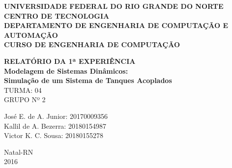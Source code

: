 \documentclass[a4paper,12pt]{article}
\begin{document}
\onehalfspacing

\thispagestyle{empty}

\setcounter{page}{1}


\begin{figure}[!ht]

\centering

\hspace{11.09cm}

\label{Logos}

\end{figure}


\vspace{-1cm}

\begin{center}
{\bf{\normalsize UNIVERSIDADE FEDERAL DO RIO GRANDE DO NORTE\\
CENTRO DE TECNOLOGIA\\
DEPARTAMENTO DE ENGENHARIA DE COMPUTAÇÃO E AUTOMAÇÃO\\
CURSO DE ENGENHARIA DE COMPUTAÇÃO
}}


\vspace{3.6cm}

{\bf{\large RELATÓRIO DA 1ª EXPERIÊNCIA\\
Modelagem de Sistemas Dinâmicos: \\ 
Simulação de um Sistema de Tanques Acoplados\\
}}
\vspace{1.5cm}
{\large TURMA: 04 \\
	GRUPO Nº 2}

\vspace{3.6cm}



\begin{flushright}
\begin{normalsize}
José E. de A. Junior: 20170009356\\
\vspace{0.8cm}
Kallil de A. Bezerra: 20180154987\\
\vspace{0.8cm}
Victor K. C. Sousa: 20180155278\\
\end{normalsize}
\end{flushright}


\vspace{2.5cm}

{\large Natal-RN\\
2016}

\end{center}
\end{document}
